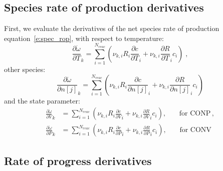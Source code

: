 \documentclass[12pt]{article}
\newcommand{\nr}{\ensuremath{{N_{reac}}}}
\newcommand{\conp}{CONP}
\newcommand{\conv}{CONV}
\newcommand{\dconp}{\ensuremath{,\qquad\text{for \conp}}}
\newcommand{\dconv}{\ensuremath{,\qquad\text{for \conv}}}
\begin{document}
\subsection{Species rate of production derivatives}
First, we evaluate the derivatives of the net species rate of production equation~\cref{e:spec_rop}, with respect to temperature:
\begin{equation}
 \label{e:dwdot_dT}
 \frac{\partial \dot{\omega} }{\partial T }_{k} = \sum_{i=1}^{\nr} \left(\nu_{k,i} R_{i} \frac{\partial c }{\partial T }_{i} + \nu_{k,i} \frac{\partial R }{\partial T }_{i} c_{i}\right) \;,
\end{equation}
other species:
\begin{equation}
 \label{e:dwdot_dnj}
 \frac{\partial \dot{\omega} }{\partial n[j] }_{k} = \sum_{i=1}^{\nr} \left(\nu_{k,i} R_{i} \frac{\partial c }{\partial n[j] }_{i} + \nu_{k,i} \frac{\partial R }{\partial n[j] }_{i} c_{i}\right)
\end{equation}
and the state parameter:
\begin{subequations}
 \label{e:dwdot_de}
 \begin{align}
  \frac{\partial \dot{\omega} }{\partial V }_{k} &= \sum_{i=1}^{\nr} \left(\nu_{k,i} R_{i} \frac{\partial c }{\partial V }_{i} + \nu_{k,i} \frac{\partial R }{\partial V }_{i} c_{i}\right)\dconp,\\
  \frac{\partial \dot{\omega} }{\partial P }_{k} &= \sum_{i=1}^{\nr} \left(\nu_{k,i} R_{i} \frac{\partial c }{\partial P }_{i} + \nu_{k,i} \frac{\partial R }{\partial P }_{i} c_{i}\right)\dconv
 \end{align}
\end{subequations}

\subsection{Rate of progress derivatives}
\end{document}
